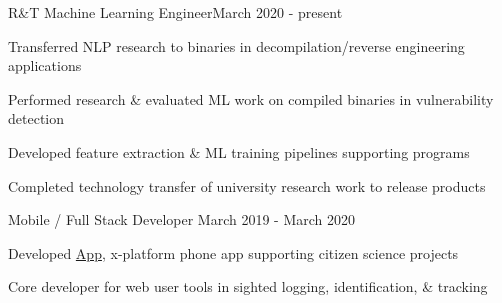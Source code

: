 \documentclass{article}
\newenvironment{**mylist}[2]{
  \subsubsection*{#1\hfill#2}
  \small
  \begin{list}{}{}
    \setlength{\topsep}{0pt}
   \setlength{\itemsep}{1pt}
   \setlength{\parskip}{0pt}
   \setlength{\parsep}{0pt}}{\end{list}\normalsize}
\newcommand{\LU}[1]{\hspace{-1em}{\bf Technologies : #1}}
\def\PT{{\bf(Part Time)}\xspace}
\begin{document}
\BSec{}%

\begin{**mylist}{\href{https://www.grammatech.com}{} \tabb R\&T Machine Learning Engineer}{March 2020 - present}
\item Transferred NLP research to binaries in decompilation/reverse engineering applications
\item Performed research \& evaluated ML work on compiled binaries in vulnerability detection
\item Developed feature extraction \& ML training pipelines supporting  programs
\item Completed technology transfer of university research work to release products
\item \LU{Python, C, PyTorch, RetDec, asts.AST, GTIRB, Docker, celery, GitLab.ci}
\end{**mylist}

\begin{**mylist}{\href{www.happywhale.com}{} \tabb Mobile / Full Stack Developer }{March 2019 - March 2020}
\item Developed \href{https://play.google.com/store/apps/details?id=com.animalus.scidir&hl=en_US}{ App}, x-platform phone app supporting citizen science projects
\item Core developer for web user tools in sighted  logging, identification, \& tracking
\item \LU{Native/TypeScript, Angular, Android/iOS, PostgreSQL, Java, Spring, firebase}
\end{**mylist}

\begin{comment}
\begin{**mylist}{\censor{\href{www.thinkful.com}{Thinkful}} \PT \tabb Data Science Technical Expert}{Jan 2019 - March 2019}
\item Provided safe environment for training \& instruction in a remote-first setting
\item Advised career transitioners in mastery of professional \& data science topics
\end{**mylist}
\end{comment}
\end{document}
